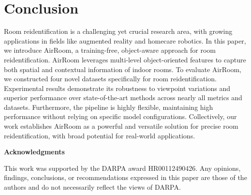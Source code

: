 \vspace{-5pt}
\section{Conclusion}
\vspace{-5pt}
\label{sec:conclusion}

Room reidentification is a challenging yet crucial research area, with growing applications in fields like augmented reality and homecare robotics. In this paper, we introduce AirRoom, a training-free, object-aware approach for room reidentification. AirRoom leverages multi-level object-oriented features to capture both spatial and contextual information of indoor rooms. To evaluate AirRoom, we constructed four novel datasets specifically for room reidentification. Experimental results demonstrate its robustness to viewpoint variations and superior performance over state-of-the-art methods across nearly all metrics and datasets. Furthermore, the pipeline is highly flexible, maintaining high performance without relying on specific model configurations. Collectively, our work establishes AirRoom as a powerful and versatile solution for precise room reidentification, with broad potential for real-world applications.

\begin{center}
\textbf{Acknowledgments}  
\end{center}
\begin{sloppypar}
\noindent This work was supported by the DARPA award HR00112490426. Any opinions, findings, conclusions, or recommendations expressed in this paper are those of the authors and do not necessarily reflect the views of DARPA.
\end{sloppypar}

